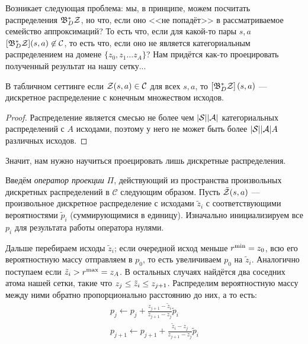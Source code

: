  Возникает следующая проблема: мы, в принципе, можем посчитать распределения $\mathfrak{B}^*_D \mathcal{Z}$, но что, если оно <<не попадёт>> в рассматриваемое семейство аппроксимаций? То есть что, если для какой-то пары $s, a$ $[\mathfrak{B}^*_D \mathcal{Z}](s, a) \not\in \mathcal{C}$, то есть что, если оно не является категориальным распределением на домене $\{z_0, z_1 \dots z_A\}$? Нам придётся как-то проецировать полученный результат на нашу сетку...
 
 \begin{proposition}
 В табличном сеттинге если $\mathcal{Z}(s, a) \in \mathcal{C}$ для всех $s, a$, то $\left[\mathfrak{B}^*_D \mathcal{Z}\right](s, a)$ --- дискретное распределение с конечным множеством исходов.
 \begin{proof} Распределение является смесью не более чем $|\mathcal{S}| |\mathcal{A}|$ категориальных распределений с $A$ исходами, поэтому у него не может быть более $|\mathcal{S}| |\mathcal{A}| A$ различных исходов.
 \end{proof}
 \end{proposition}
 
 Значит, нам нужно научиться проецировать лишь дискретные распределения.
 
 \begin{definition}
 Введём \emph{оператор проекции} $\Pi$, действующий из пространства произвольных дискретных распределений в $\mathcal{C}$ следующим образом. Пусть $\tilde{\mathcal{Z}}(s, a)$ --- произвольное дискретное распределение с исходами $\tilde{z}_i$ с соответствующими вероятностями $\tilde{p}_i$ (суммирующимися в единицу). Изначально инициализируем все $p_i$ для результата работы оператора нулями.
 
 Дальше перебираем исходы $\tilde{z}_i$; если очередной исход меньше $r^{\min} \HM= z_0$, всю его вероятностную массу отправляем в $p_0$, то есть увеличиваем $p_0$ на $\tilde{z}_i$. Аналогично поступаем если $\tilde{z}_i \HM> r^{\max} = z_A$. В остальных случаях найдётся два соседних атома нашей сетки, такие что $z_j \HM\le \tilde{z}_i \HM\le z_{j+1}$. Распределим вероятностную массу между ними обратно пропорционально расстоянию до них, а то есть:
\begin{equation}\label{projector}
\begin{split} 
p_j \leftarrow p_j + \frac{z_{j+1} - \tilde{z}_i}{z_{j+1} - z_j} \tilde{p}_i  \\
p_{j+1} \leftarrow p_{j+1} + \frac{\tilde{z}_i - z_j}{z_{j+1} - z_j} \tilde{p}_i
\end{split}
\end{equation}
 \end{definition}

